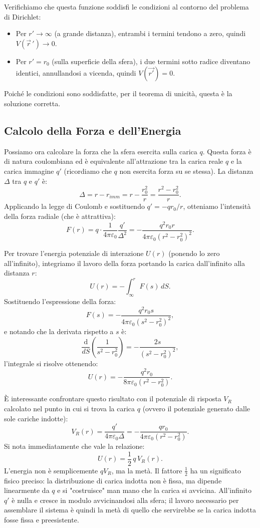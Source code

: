 \documentclass{book}
\begin{document}
Verifichiamo che questa funzione soddisfi le condizioni al contorno del problema di Dirichlet:
\begin{itemize}
  \item Per $r'\to\infty$ (a grande distanza), entrambi i termini tendono a zero, quindi $V(\vec{r}\,')\to 0$.
  \item Per $r'=r_0$ (sulla superficie della sfera), i due termini sotto radice diventano identici, annullandosi a vicenda, quindi $V(\vec{ r'})=0$.
\end{itemize}
Poiché le condizioni sono soddisfatte, per il teorema di unicità, questa è la soluzione corretta.

\subsection*{Calcolo della Forza e dell'Energia}

Possiamo ora calcolare la forza che la sfera esercita sulla carica $q$. Questa forza è di natura coulombiana ed è equivalente all'attrazione tra la carica reale $q$ e la carica immagine $q'$ (ricordiamo che $q$ non esercita forza su se stessa).
La distanza $\Delta$ tra $q$ e $q'$ è:
\[
\Delta = r - r_{imm} = r - \frac{r_0^2}{r} = \frac{r^2-r_0^2}{r}.
\]
Applicando la legge di Coulomb e sostituendo $q'=-q r_0/r$, otteniamo l'intensità della forza radiale (che è attrattiva):
\[
F(r) = q\cdot \frac{1}{4\pi\varepsilon_0}\frac{q'}{\Delta^{2}}
= -\frac{q^{2}r_{0}r}{4\pi\varepsilon_{0}(r^{2}-r_{0}^{2})^{2}}.
\]

Per trovare l'energia potenziale di interazione $U(r)$ (ponendo lo zero all'infinito), integriamo il lavoro della forza portando la carica dall'infinito alla distanza $r$:
\[
U(r) = -\int_{\infty}^{r} F(s)\,dS.
\]
Sostituendo l'espressione della forza:
\[
F(s) = -\frac{q^{2}r_{0}s}{4\pi\varepsilon_{0}(s^{2}-r_0^{2})^{2}},
\]
e notando che la derivata rispetto a $s$ è:
\[
\frac{\mathrm{d}}{dS}\!\left(\frac{1}{s^{2}-r_0^{2}}\right) = -\frac{2s}{(s^{2}-r_0^{2})^{2}},
\]
l'integrale si risolve ottenendo:
\[
U(r) = -\frac{q^{2}r_{0}}{8\pi\varepsilon_{0}(r^{2}-r_{0}^{2})}.
\]

È interessante confrontare questo risultato con il potenziale di risposta $V_R$ calcolato nel punto in cui si trova la carica $q$ (ovvero il potenziale generato dalle sole cariche indotte):
\[
V_{R}(r)=\frac{q'}{4\pi\varepsilon_0\Delta} = -\frac{q r_0}{4\pi\varepsilon_0 (r^{2}-r_0^{2})}.
\]
Si nota immediatamente che vale la relazione:
\[
U(r) = \frac{1}{2}\, q\,V_{R}(r).
\]
L'energia non è semplicemente $qV_R$, ma la metà. Il fattore $\tfrac12$ ha un significato fisico preciso: la distribuzione di carica indotta non è fissa, ma dipende linearmente da $q$ e si "costruisce" man mano che la carica si avvicina. All'infinito $q'$ è nulla e cresce in modulo avvicinandosi alla sfera; il lavoro necessario per assemblare il sistema è quindi la metà di quello che servirebbe se la carica indotta fosse fissa e preesistente.
\end{document}
